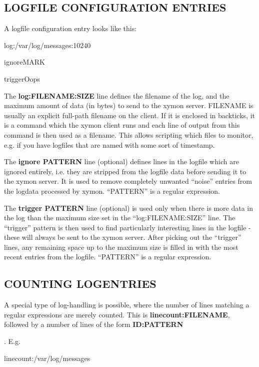  
\subsection{LOGFILE CONFIGURATION ENTRIES}
 A logfile configuration entry looks like this: 

  
log:/var/log/messages:10240  
 
ignoreMARK  
 
triggerOops 


  The \textbf{log:FILENAME:SIZE} line defines the filename of the log,
  and the maximum amount of data (in bytes) to send to the xymon
  server. FILENAME is usually an explicit full-path filename on the
  client. If it is enclosed in backticks, it is a command which the
  xymon client runs and each line of output from this command is then
  used as a filename. This allows scripting which files to monitor,
  e.g. if you have logfiles that are named with some sort of
  timestamp. 



  The \textbf{ignore PATTERN} line (optional) defines lines in the
  logfile which are ignored entirely, i.e. they are stripped from the
  logfile data before sending it to the xymon server. It is used to
  remove completely unwanted ``noise'' entries from the logdata
  processed by xymon. ``PATTERN'' is a regular expression. 



  The \textbf{trigger PATTERN}
 line (optional) is used only when there is more data in the log than
 the maximum size set in the ``log:FILENAME:SIZE'' line. The
 ``trigger'' pattern is then used to find particularly interesting
 lines in the logfile - these will always be sent to the xymon
 server. After picking out the ``trigger'' lines, any remaining space
 up to the maximum size is filled in with the most recent entries from
 the logfile. ``PATTERN'' is a regular expression. 



 
\subsection{COUNTING LOGENTRIES}
 A special type of log-handling is possible, where the number of lines
 matching a regular expressions are merely counted. This is
 \textbf{linecount:FILENAME}, followed by a number of lines of the
 form \textbf{ID:PATTERN}

. E.g. 

  
linecount:/var/log/messages  
 
